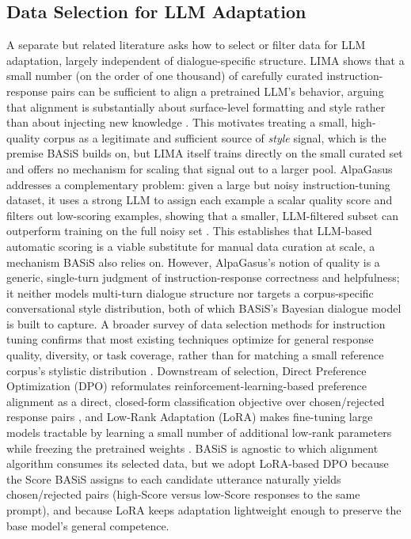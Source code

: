 \documentclass[manuscript,review,anonymous]{acmart}
\begin{document}
\subsection{Data Selection for LLM Adaptation}
A separate but related literature asks how to select or filter data for LLM adaptation, largely independent of dialogue-specific structure. LIMA shows that a small number (on the order of one thousand) of carefully curated instruction-response pairs can be sufficient to align a pretrained LLM's behavior, arguing that alignment is substantially about surface-level formatting and style rather than about injecting new knowledge \cite{zhou2023lima}. This motivates treating a small, high-quality corpus as a legitimate and sufficient source of \emph{style} signal, which is the premise BASiS builds on, but LIMA itself trains directly on the small curated set and offers no mechanism for scaling that signal out to a larger pool. AlpaGasus addresses a complementary problem: given a large but noisy instruction-tuning dataset, it uses a strong LLM to assign each example a scalar quality score and filters out low-scoring examples, showing that a smaller, LLM-filtered subset can outperform training on the full noisy set \cite{chen2023alpagasus}. This establishes that LLM-based automatic scoring is a viable substitute for manual data curation at scale, a mechanism BASiS also relies on. However, AlpaGasus's notion of quality is a generic, single-turn judgment of instruction-response correctness and helpfulness; it neither models multi-turn dialogue structure nor targets a corpus-specific conversational style distribution, both of which BASiS's Bayesian dialogue model is built to capture. A broader survey of data selection methods for instruction tuning confirms that most existing techniques optimize for general response quality, diversity, or task coverage, rather than for matching a small reference corpus's stylistic distribution \cite{zhang2025datasurvey}. Downstream of selection, Direct Preference Optimization (DPO) reformulates reinforcement-learning-based preference alignment as a direct, closed-form classification objective over chosen/rejected response pairs \cite{rafailov2023dpo}, and Low-Rank Adaptation (LoRA) makes fine-tuning large models tractable by learning a small number of additional low-rank parameters while freezing the pretrained weights \cite{hu2021lora}. BASiS is agnostic to which alignment algorithm consumes its selected data, but we adopt LoRA-based DPO because the Score BASiS assigns to each candidate utterance naturally yields chosen/rejected pairs (high-Score versus low-Score responses to the same prompt), and because LoRA keeps adaptation lightweight enough to preserve the base model's general competence.
\end{document}
